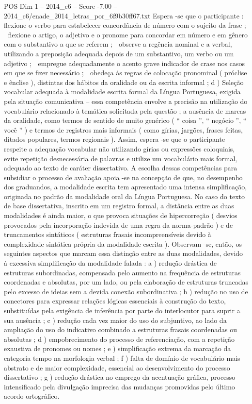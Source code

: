 \begin{textsample}{POS Dim 1 – 2014\_c6 – Score -7.00 – 2014\_c6/enade\_2014\_letras\_por\_6f9b30ff67.txt}
Espera -se que o participante :  flexione o verbo para estabelecer concordância de número com o sujeito da frase ;  flexione o artigo, o adjetivo e o pronome para concordar em número e em gênero com o substantivo a que se referem ;  observe a regência nominal e a verbal, utilizando a preposição adequada depois de um substantivo, um verbo ou um adjetivo ;  empregue adequadamente o acento grave indicador de crase nos casos em que se fizer necessário ;  obedeça às regras de colocação pronominal ( próclise e ênclise ), distintas dos hábitos da oralidade ou da escrita informal ; d ) Seleção vocabular adequada à modalidade escrita formal da Língua Portuguesa, exigida pela situação comunicativa – essa competência envolve a precisão na utilização do vocabulário relacionado à temática solicitada pela questão ; a ausência de marcas da oralidade, como termos de sentido de muito genérico ( “ coisa ”, “ negócio ”, “ você ” ) e termos de registros mais informais ( como gírias, jargões, frases feitas, ditados populares, termos regionais ).
Assim, espera -se que o participante respeite a adequação vocabular não utilizando gírias ou expressões coloquiais, evite repetição desnecessária de palavras e utilize um vocabulário mais formal, adequado ao texto de caráter dissertativo.
A escolha dessas competências para subsidiar o processo de avaliação apoia -se na concepção de que, no desempenho dos graduandos, a modalidade escrita tem apresentado uma intensa simplificação, originada no padrão da modalidade oral da Língua Portuguesa.
No caso do texto de base dissertativa, inscrito em um registro formal, a distância entre as duas modalidades é ainda maior, o que provoca situações de hipercorreção ( desvios provocados pela incorporação indevida de uma regra da norma-padrão ) e de truncamentos sintáticos ( estruturas frasais incompreensíveis devido à complexidade sintática própria da modalidade escrita ).
Observam -se, então, os seguintes aspectos que marcam essa distinção entre as duas modalidades, devido à excessiva simplificação da modalidade falada : a ) redução drástica de estruturas subordinadas, compensada pelo aumento na frequência de estruturas coordenadas e absolutas, por um lado, ou pela elaboração de estruturas truncadas pelo excesso de ideias sem a devida conexão subordinativa ; b ) redução no uso de conectores para expressar relações lógicas essenciais à construção do texto, substituídas pela exigência de inferência por parte do interlocutor para suprir a sua ausência ; c ) redução cada vez maior do uso do subjuntivo, ao lado da ampliação do uso do indicativo combinado a estruturas frasais coordenadas ou absolutas ; d ) empobrecimento do processo de referenciação, com a repetição exaustiva de pronomes ou nomes ; e ) simplificação extrema da marcação da categoria tempo na morfologia verbal ; f ) falta de domínio de vocabulário mais abstrato e de maior complexidade, essencial ao desenvolvimento do processo dissertativo ; g ) redução drástica no emprego da acentuação gráfica, processo intensificado pela divulgação imprecisa das mudanças promovidas pelo último acordo ortográfico.

\end{textsample}
